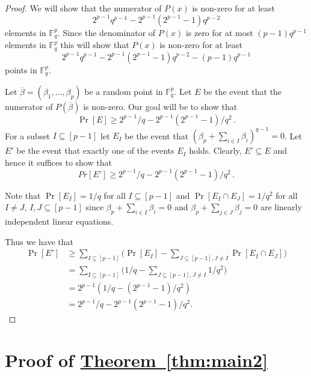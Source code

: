 \documentclass[10pt]{article}
\theoremstyle{definition}
\numberwithin{equation}{section}
\newcommand{\expref}[2]{\texorpdfstring{\hyperref[#2]{#1~\ref{#2}}}{#1~\ref{#2}}}
\newcommand{\F}{{\mathbb{F}}}
\begin{document}
\begin{proof}
We will show that the numerator of $P(x)$ is non-zero for at least $$2^{p-1}q^{p-1} -  2^{p-1}(2^{p-1}-1)q^{p-2}$$ elements in $\F_q^p$.
Since the denominator of $P(x)$ is zero for at most $(p-1)q^{p-1}$ elements in $ \F_q^p$ this will show that $P(x)$ is non-zero
for at least $$2^{p-1}q^{p-1} -  2^{p-1}(2^{p-1}-1)q^{p-2} - (p-1)q^{p-1}  $$ points in $\F_q^p$.

Let $ \overline \beta = (\beta_1,\ldots, \beta_p) $ be a random point in $\F_q^p$.
Let $E$ be the event that the numerator of $P(\overline \beta)$ is non-zero. Our goal will be to show that  $$\Pr[E] \geq  2^{p-1}/q - 2^{p-1}(2^{p-1}-1)/q^2\,.$$
For a subset $I \subseteq [p-1]$ let
$E_{I}$ be the event that $ (\beta_p + \sum_{i \in I} \beta_i )^{q-1} = 0$. Let $E'$ be the event that exactly one of the events $E_I$ holds. Clearly,
$E' \subseteq E$ and hence it suffices to show that $$Pr[E'] \geq  2^{p-1}/q - 2^{p-1}(2^{p-1}-1)/q^2\,.$$

 Note that $\Pr[E_I] = 1/q$ for all $I \subseteq [p-1]$ and
$\Pr[E_I \cap E_J] = 1/q^2$ for all $I \neq J$, $I,J \subseteq [p-1]$
since $\beta_p + \sum_{i \in I} \beta_i =0 $ and
$\beta_p + \sum_{j \in J} \beta_j = 0$ are linearly independent linear equations.

Thus we have that
%
\begin{align*}
\Pr[E'] &   \geq  \sum_{I \subseteq [p-1]} \bigg(\Pr[E_I] - \sum_{J \subseteq [p-1], J \neq I} \Pr[E_I \cap E_J] \bigg) \\
& = \sum_{I \subseteq [p-1]} \bigg(1/q -  \sum_{J \subseteq [p-1], J \neq I} 1/q^2 \bigg) \\[1ex]
& =   2^{p-1}(1/q - (2^{p-1} - 1)/q^2)  \\[1ex]
& =  2^{p-1}/q - 2^{p-1}(2^{p-1}-1)/q^2.
%
\end{align*}
\end{proof}



\section{Proof of \expref{Theorem}{thm:main2}}
\label{sec:final}
\end{document}
